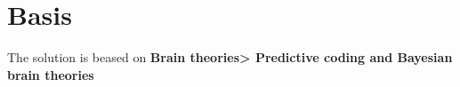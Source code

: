 \documentclass[a4paper]{article}
\title{}
\date{}
\begin{document}
    \maketitle
    \section{Basis}
        The solution is beased on \textbf{Brain theories> Predictive coding and Bayesian brain theories}
        \paragraph{}
    
    
\end{document}
